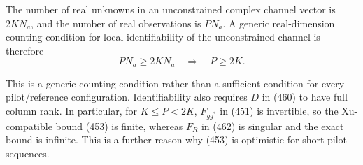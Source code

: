 \documentclass[12pt,a4paper]{article}
\begin{document}
The number of real unknowns in an unconstrained complex channel vector
is $2KN_a$, and the number of real observations is $PN_a$. A generic
real-dimension counting condition for local identifiability of the
unconstrained channel is therefore
\begin{equation}
\boxed{
PN_a\geq2KN_a
\quad\Longrightarrow\quad
P\geq2K.
}
\tag{466}
\end{equation}

This is a generic counting condition rather than a sufficient condition
for every pilot/reference configuration. Identifiability also requires
$D$ in (460) to have full column rank.
In particular, for \(K\leq P<2K\), \(F_{gg^*}\) in (451) is invertible, so the
Xu-compatible bound (453) is finite, whereas \(F_R\) in (462) is singular and the
exact bound is infinite. This is a further reason why (453) is optimistic for
short pilot sequences.

\end{document}
